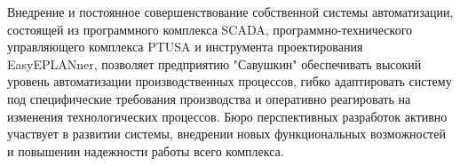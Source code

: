 {	\par \redline Внедрение и постоянное совершенствование собственной системы автоматизации, состоящей из программного комплекса SCADA, программно-технического управляющего комплекса PTUSA и инструмента проектирования EasyEPLANner, позволяет предприятию "Савушкин" обеспечивать высокий уровень автоматизации производственных процессов, гибко адаптировать систему под специфические требования производства и оперативно реагировать на изменения технологических процессов. Бюро перспективных разработок активно участвует в развитии системы, внедрении новых функциональных возможностей и повышении надежности работы всего комплекса.
	
	\par
}
